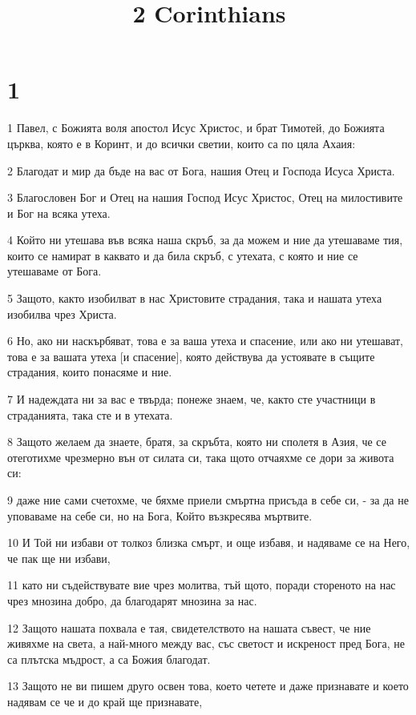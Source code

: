 

\title{2 Corinthians}


\chapter{1}

\par 1 Павел, с Божията воля апостол Исус Христос, и брат Тимотей, до Божията църква, която е в Коринт, и до всички светии, които са по цяла Ахаия:
\par 2 Благодат и мир да бъде на вас от Бога, нашия Отец и Господа Исуса Христа.
\par 3 Благословен Бог и Отец на нашия Господ Исус Христос, Отец на милостивите и Бог на всяка утеха.
\par 4 Който ни утешава във всяка наша скръб, за да можем и ние да утешаваме тия, които се намират в каквато и да била скръб, с утехата, с която и ние се утешаваме от Бога.
\par 5 Защото, както изобилват в нас Христовите страдания, така и нашата утеха изобилва чрез Христа.
\par 6 Но, ако ни наскърбяват, това е за ваша утеха и спасение, или ако ни утешават, това е за вашата утеха [и спасение], която действува да устоявате в същите страдания, които понасяме и ние.
\par 7 И надеждата ни за вас е твърда; понеже знаем, че, както сте участници в страданията, така сте и в утехата.
\par 8 Защото желаем да знаете, братя, за скръбта, която ни сполетя в Азия, че се отеготихме чрезмерно вън от силата си, така щото отчаяхме се дори за живота си:
\par 9 даже ние сами счетохме, че бяхме приели смъртна присъда в себе си, - за да не уповаваме на себе си, но на Бога, Който възкресява мъртвите.
\par 10 И Той ни избави от толкоз близка смърт, и още избавя, и надяваме се на Него, че пак ще ни избави,
\par 11 като ни съдействувате вие чрез молитва, тъй щото, поради стореното на нас чрез мнозина добро, да благодарят мнозина за нас.
\par 12 Защото нашата похвала е тая, свидетелството на нашата съвест, че ние живяхме на света, а най-много между вас, със светост и искреност пред Бога, не са плътска мъдрост, а са Божия благодат.
\par 13 Защото не ви пишем друго освен това, което четете и даже признавате и което надявам се че и до край ще признавате,
